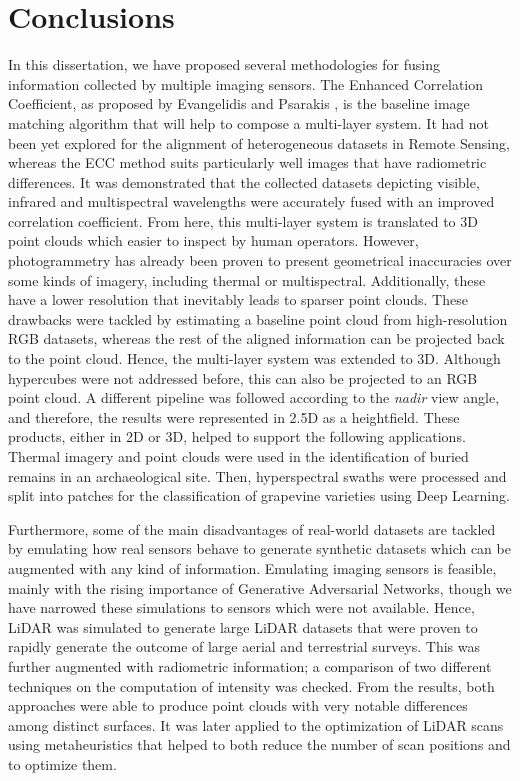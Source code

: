 \chapter{Conclusions}
\label{sec:conclusions}

In this dissertation, we have proposed several methodologies for fusing information collected by multiple imaging sensors. The Enhanced Correlation Coefficient, as proposed by Evangelidis and Psarakis \cite{evangelidis_parametric_2008}, is the baseline image matching algorithm that will help to compose a multi-layer system. It had not been yet explored for the alignment of heterogeneous datasets in Remote Sensing, whereas the ECC method suits particularly well images that have radiometric differences. It was demonstrated that the collected datasets depicting visible, infrared and multispectral wavelengths were accurately fused with an improved correlation coefficient. From here, this multi-layer system is translated to 3D point clouds which easier to inspect by human operators. However, photogrammetry has already been proven to present geometrical inaccuracies over some kinds of imagery, including thermal or multispectral. Additionally, these have a lower resolution that inevitably leads to sparser point clouds. These drawbacks were tackled by estimating a baseline point cloud from high-resolution RGB datasets, whereas the rest of the aligned information can be projected back to the point cloud. Hence, the multi-layer system was extended to 3D. Although hypercubes were not addressed before, this can also be projected to an RGB point cloud. A different pipeline was followed according to the \textit{nadir} view angle, and therefore, the results were represented in 2.5D as a heightfield. These products, either in 2D or 3D, helped to support the following applications. Thermal imagery and point clouds were used in the identification of buried remains in an archaeological site. Then, hyperspectral swaths were processed and split into patches for the classification of grapevine varieties using Deep Learning.

Furthermore, some of the main disadvantages of real-world datasets are tackled by emulating how real sensors behave to generate synthetic datasets which can be augmented with any kind of information. Emulating imaging sensors is feasible, mainly with the rising importance of Generative Adversarial Networks, though we have narrowed these simulations to sensors which were not available. Hence, LiDAR was simulated to generate large LiDAR datasets that were proven to rapidly generate the outcome of large aerial and terrestrial surveys. This was further augmented with radiometric information; a comparison of two different techniques on the computation of intensity was checked. From the results, both approaches were able to produce point clouds with very notable differences among distinct surfaces. It was later applied to the optimization of LiDAR scans using metaheuristics that helped to both reduce the number of scan positions and to optimize them.

